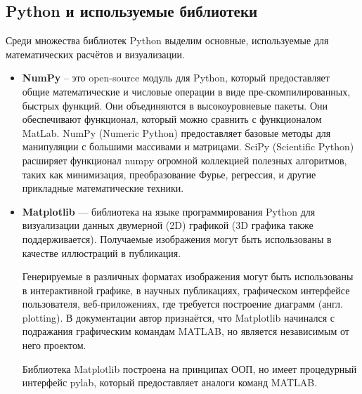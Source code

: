 \subsection{Python и используемые библиотеки}
Среди множества библиотек Python выделим основные, используемые для математических расчётов и визуализации.
\begin{itemize}
	\item \textbf{NumPy} -- это open-source модуль для Python, который предоставляет общие математические и числовые операции в виде пре-скомпилированных, быстрых функций. Они объединяются в высокоуровневые пакеты. Они обеспечивают функционал, который можно сравнить с функционалом MatLab. NumPy (Numeric Python) предоставляет базовые методы для манипуляции с большими массивами и матрицами. SciPy (Scientific Python) расширяет функционал numpy огромной коллекцией полезных алгоритмов, таких как минимизация, преобразование Фурье, регрессия, и другие прикладные математические техники.
	
	\item \textbf{Matplotlib} — библиотека на языке программирования Python для визуализации данных двумерной (2D) графикой (3D графика также поддерживается). Получаемые изображения могут быть использованы в качестве иллюстраций в публикация.
	
	Генерируемые в различных форматах изображения могут быть использованы в интерактивной графике, в научных публикациях, графическом интерфейсе пользователя, веб-приложениях, где требуется построение диаграмм (англ. plotting). В документации автор признаётся, что Matplotlib начинался с подражания графическим командам MATLAB, но является независимым от него проектом.
	
	Библиотека Matplotlib построена на принципах ООП, но имеет процедурный интерфейс pylab, который предоставляет аналоги команд MATLAB.
\end{itemize}

